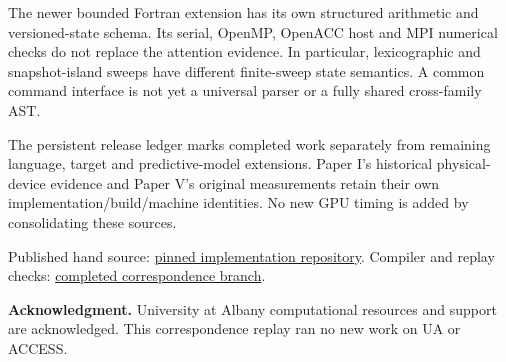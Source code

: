 The newer bounded Fortran extension has its own structured arithmetic and versioned-state schema. Its serial, OpenMP, OpenACC host and MPI numerical checks do not replace the attention evidence. In particular, lexicographic and snapshot-island sweeps have different finite-sweep state semantics. A common command interface is not yet a universal parser or a fully shared cross-family AST.

The persistent release ledger marks completed work separately from remaining language, target and predictive-model extensions. Paper I's historical physical-device evidence and Paper V's original measurements retain their own implementation/build/machine identities. No new GPU timing is added by consolidating these sources.



\par Published hand source: \href{https://github.com/womenflyplanes/moa-attention-verified-mullin}{pinned implementation repository}.
Compiler and replay checks: \href{https://github.com/womenflyplanes/moa-compiler/tree/codex/papers-i-iv-correspondence}{completed correspondence branch}.

\textbf{Acknowledgment.} University at Albany computational resources and support
are acknowledged. This correspondence replay ran no new work on UA or ACCESS.

